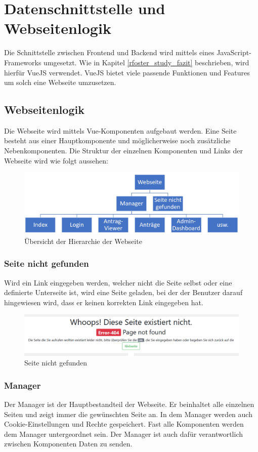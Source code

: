\section{Datenschnittstelle und Webseitenlogik}
Die Schnittstelle zwischen Frontend und Backend wird mittels eines JavaScript-Frameworks umgesetzt. Wie in Kapitel \ref{rfoster_study_fazit} beschrieben, wird hierfür VueJS verwendet. VueJS bietet viele passende Funktionen und Features um solch eine Webseite umzusetzen.
\subsection{Webseitenlogik}
Die Webseite wird mittels Vue-Komponenten aufgebaut werden. Eine Seite besteht aus einer Hauptkomponente und möglicherweise noch zusätzliche Nebenkomponenten. Die Struktur der einzelnen Komponenten und Links der Webseite wird wie folgt aussehen:
\begin{figure}[H]
	\centering
	\includegraphics[width=0.8\linewidth]{images/Webseite_hierarchie}
	\caption[Hierarchie der Webseite]{Übersicht der Hierarchie der Webseite}
	\label{fig:webseitehierachie}
\end{figure}

\subsubsection{Seite nicht gefunden}
Wird ein Link eingegeben werden, welcher nicht die Seite selbst oder eine definierte Unterseite ist, wird eine Seite geladen, bei der der Benutzer darauf hingewiesen wird, dass er keinen korrekten Link eingegeben hat.
\begin{figure}[H]
	\centering
	\includegraphics[width=0.6\linewidth]{images/page_not_found}
	\caption[Seite nicht gefunden]{Seite nicht gefunden}
	\label{fig:pagenotfound}
\end{figure}

\subsubsection{Manager}
Der Manager ist der Hauptbestandteil der Webseite. Er beinhaltet alle einzelnen Seiten und zeigt immer die gewünschten Seite an. In dem Manager werden auch Cookie-Einstellungen und Rechte gespeichert. Fast alle Komponenten werden dem Manager untergeordnet sein. Der Manager ist auch dafür verantwortlich zwischen Komponenten Daten zu senden.

